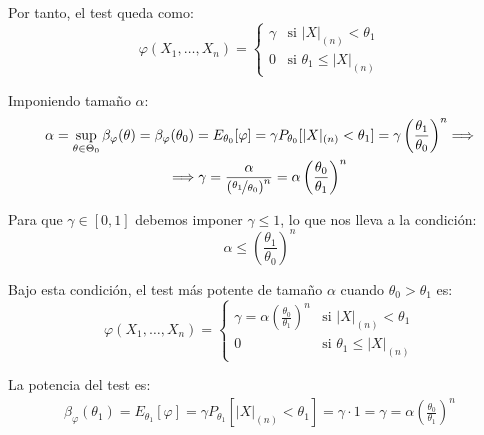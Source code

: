 \begin{ejercicio}
\begin{description}
\begin{description}
            Por tanto, el test queda como:
            \begin{equation*}
                \varphi(X_1, \ldots, X_n) = \left\{\begin{array}{ll}
                    \gamma & \text{si\ } |X|_{(n)} < \theta_1 \\
                    0 & \text{si\ } \theta_1 \leq |X|_{(n)}
                \end{array}\right.
            \end{equation*}

            Imponiendo tamaño $\alpha$:
            \begin{multline*}
                \alpha = \sup_{\theta \in \Theta_0}\beta_\varphi(\theta) = \beta_\varphi(\theta_0) = E_{\theta_0}[\varphi] = \gamma P_{\theta_0}[|X|_{(n)} < \theta_1] = \gamma \left(\frac{\theta_1}{\theta_0}\right)^n \Longrightarrow \\ \Longrightarrow\gamma = \frac{\alpha}{\left(\nicefrac{\theta_1}{\theta_0}\right)^n}
                = \alpha\left(\frac{\theta_0}{\theta_1}\right)^n
            \end{multline*}

            Para que $\gamma \in [0,1]$ debemos imponer $\gamma\leq 1$, lo que nos lleva a la condición:
            \begin{equation*}
                \alpha \leq \left(\frac{\theta_1}{\theta_0}\right)^n
            \end{equation*}

            Bajo esta condición, el test más potente de tamaño $\alpha$ cuando $\theta_0 > \theta_1$ es:
            \begin{equation*}
                \varphi(X_1, \ldots, X_n) = \left\{\begin{array}{ll}
                    \gamma = \alpha\left(\frac{\theta_0}{\theta_1}\right)^n & \text{si\ } |X|_{(n)} < \theta_1 \\
                    0 & \text{si\ } \theta_1 \leq |X|_{(n)}
                \end{array}\right.
            \end{equation*}

            La potencia del test es:
            \begin{align*}
                \beta_\varphi(\theta_1) = E_{\theta_1}[\varphi] = \gamma P_{\theta_1}[|X|_{(n)} < \theta_1] = \gamma \cdot 1 = \gamma = \alpha\left(\frac{\theta_0}{\theta_1}\right)^n
            \end{align*}
        \end{description}
    \end{description}



\end{ejercicio}
